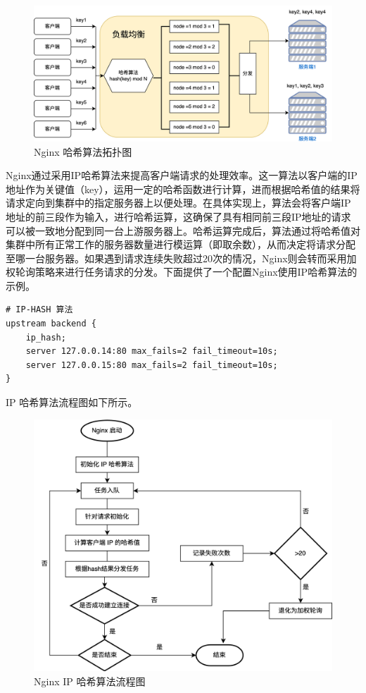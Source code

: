 \begin{figure}[htb]
	\centering
	\includegraphics[width=\textwidth]{figures/hash-algo.png}
	\caption{Nginx 哈希算法拓扑图}
\end{figure}

Nginx通过采用IP哈希算法来提高客户端请求的处理效率。这一算法以客户端的IP地址作为关键值（key），运用一定的哈希函数进行计算，进而根据哈希值的结果将请求定向到集群中的指定服务器上以便处理。在具体实现上，算法会将客户端IP地址的前三段作为输入，进行哈希运算，这确保了具有相同前三段IP地址的请求可以被一致地分配到同一台上游服务器上。哈希运算完成后，算法通过将哈希值对集群中所有正常工作的服务器数量进行模运算（即取余数），从而决定将请求分配至哪一台服务器。如果遇到请求连续失败超过20次的情况，Nginx则会转而采用加权轮询策略来进行任务请求的分发。下面提供了一个配置Nginx使用IP哈希算法的示例。

\begin{lstlisting}
# IP-HASH 算法
upstream backend {
    ip_hash;
    server 127.0.0.14:80 max_fails=2 fail_timeout=10s;
    server 127.0.0.15:80 max_fails=2 fail_timeout=10s;
}
\end{lstlisting}

IP 哈希算法流程图如下所示。

\begin{figure}[htb]
	\centering
	\includegraphics[width=\textwidth]{figures/hash-flowchart.png}
	\caption{Nginx IP 哈希算法流程图}
\end{figure}

